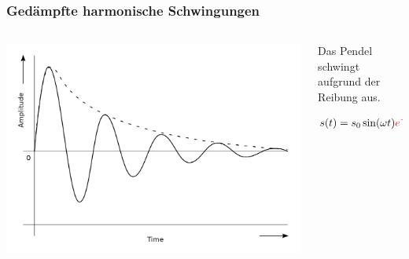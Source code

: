 \documentclass{beamer}
\begin{document}
\begin{frame}
\frametitle{Gedämpfte harmonische Schwingungen}


\begin{columns}[c]

\begin{column}{7cm}
\begin{center}
    \includegraphics[width=\textwidth]{Damped_sinewave.svg.png}
\end{center}
\end{column}

\begin{column}{4cm}
Das Pendel schwingt aufgrund der Reibung aus. 


\[
s(t) =  s_0 \sin (\omega t) \textcolor{red}{e^{-\delta t}}
\]
\end{column}


\end{columns}

\end{frame}



\end{document}
